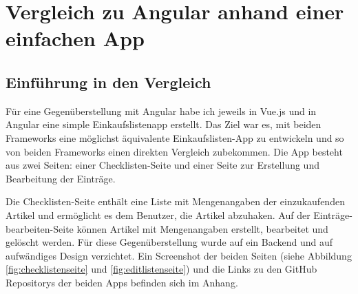 

\chapter{Vergleich zu Angular anhand einer einfachen App}


\section{Einführung in den Vergleich}
Für eine Gegenüberstellung mit Angular habe ich jeweils in Vue.js und in Angular eine
simple Einkaufslistenapp erstellt.
Das Ziel war es, mit beiden Frameworks eine möglichst äquivalente Einkaufslisten-App zu entwickeln und
so von beiden Frameworks einen direkten Vergleich zubekommen.
Die App besteht aus zwei Seiten: einer Checklisten-Seite und einer Seite zur Erstellung und Bearbeitung der Einträge.

Die Checklisten-Seite enthält eine Liste mit Mengenangaben der einzukaufenden Artikel und ermöglicht es dem Benutzer, die Artikel abzuhaken.
Auf der Einträge-bearbeiten-Seite können Artikel mit Mengenangaben erstellt, bearbeitet und gelöscht werden.
Für diese Gegenüberstellung wurde auf ein Backend und auf aufwändiges Design verzichtet.
Ein Screenshot der beiden Seiten (siehe Abbildung \ref{fig:checklistenseite} und \ref{fig:editlistenseite}) und die Links zu den GitHub Repositorys der beiden Apps befinden sich im Anhang.


